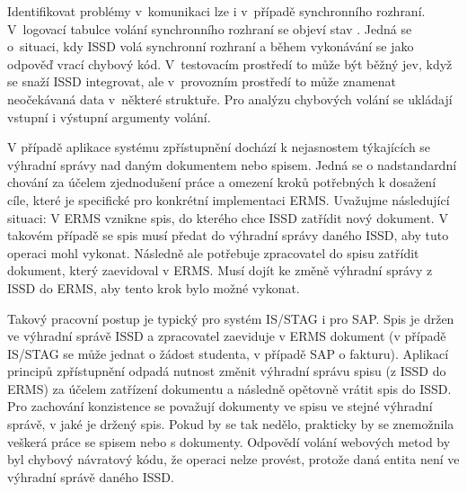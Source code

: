 \documentclass[
  master,
  field=ainfp,
  biblatex,
  language=czech,
  glossaries,
  theorems=false,
  index
]{kidiplom}
\begin{document}
Identifikovat problémy v~komunikaci lze i v~případě synchronního rozhraní. V~logovací tabulce volání synchronního rozhraní se objeví stav . Jedná se o~situaci, kdy ISSD volá synchronní rozhraní a během vykonávání se jako odpověď vrací chybový kód. V~testovacím prostředí to může být běžný jev, když se snaží ISSD integrovat, ale v~provozním prostředí to může znamenat neočekávaná data v~některé struktuře. Pro analýzu chybových volání se ukládají vstupní i výstupní argumenty volání.

V případě aplikace systému zpřístupnění dochází k nejasnostem týkajících se výhradní správy nad daným dokumentem nebo spisem. Jedná se o nadstandardní chování za účelem zjednodušení práce a omezení kroků potřebných k dosažení cíle, které je specifické pro konkrétní implementaci ERMS. Uvažujme následující situaci: V ERMS vznikne spis, do kterého chce ISSD zatřídit nový dokument. V takovém případě se spis musí předat do výhradní správy daného ISSD, aby tuto operaci mohl vykonat. Následně ale potřebuje zpracovatel do spisu zatřídit dokument, který zaevidoval v ERMS. Musí dojít ke změně výhradní správy z ISSD do ERMS, aby tento krok bylo možné vykonat.

Takový pracovní postup je typický pro systém IS/STAG i pro SAP. Spis je držen ve výhradní správě ISSD a zpracovatel zaeviduje v ERMS dokument (v případě IS/STAG se může jednat o žádost studenta, v případě SAP o fakturu). Aplikací principů zpřístupnění odpadá nutnost změnit výhradní správu spisu (z ISSD do ERMS) za účelem zatřízení dokumentu a následně opětovně vrátit spis do ISSD. Pro zachování konzistence se považují dokumenty ve spisu ve stejné výhradní správě, v jaké je držený spis. Pokud by se tak nedělo, prakticky by se znemožnila veškerá práce se spisem nebo s dokumenty. Odpovědí volání webových metod by byl chybový návratový kódu, že operaci nelze provést, protože daná entita není ve výhradní správě daného ISSD.
\end{document}
